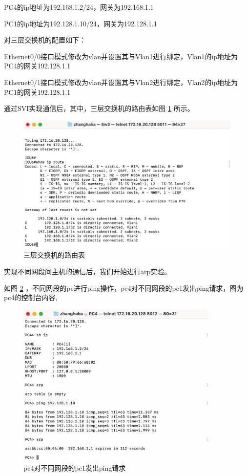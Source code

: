 \documentclass[a4paper,12pt]{report}
\begin{document}
\begin{spacing}{1.5}
PC4的ip地址为192.168.1.2/24，网关为192.168.1.1

PC1的ip地址为192.128.1.10/24，网关为192.128.1.1

对三层交换机的配置如下：

Ethernet0/0接口模式修改为vlan并设置其与Vlan1进行绑定，Vlan1的ip地址为PC4的网关192.128.1.1 

Ethernet0/1接口模式修改为vlan并设置其与Vlan2进行绑定，Vlan2的ip地址为PC1的网关192.128.1.1

通过SVI实现通信后，其中，三层交换机的路由表如图 \ref{pic12} 所示。


\begin{figure}[h!]
  \centering
\includegraphics[width=12cm]{figure/sw3_vlan.png}
\caption{三层交换机的路由表}
\label{pic12}
\end{figure}

实现不同网段间主机的通信后，我们开始进行arp实验。


如图 \ref{pic13} ，不同网段的pc进行ping操作，pc4对不同网段的pc1发出ping请求，图为pc4的控制台内容,

\begin{figure}[htb!]
  \centering
\includegraphics[width=10cm]{figure/pc4_arp.png}
\caption{pc4对不同网段的pc1发出ping请求}
\label{pic13}
\end{figure}


\end{spacing}
\end{document}

